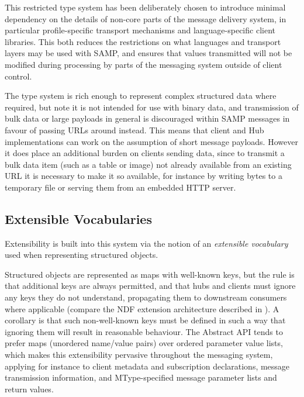 \documentclass[5p]{elsarticle}
\begin{document}
This restricted type system has been deliberately chosen to introduce
minimal dependency on the details of
non-core parts of the message delivery system,
in particular profile-specific transport mechanisms and language-specific
client libraries.
This both reduces the restrictions on what languages and transport layers
may be used with SAMP, and ensures that values transmitted will
not be modified during processing by parts of the messaging system
outside of client control.


The type system is rich enough to represent complex structured data
where required, but note it is not intended for use with
binary data, and transmission of bulk data or large payloads
in general is discouraged within SAMP messages in favour of
passing URLs around instead.
This means that client and Hub implementations can work on the assumption
of short message payloads.
However it does place an additional burden on clients sending data,
since to transmit a bulk data item (such as a table or image)
not already available from an existing URL
it is necessary to make it so available, for instance by writing
bytes to a temporary file or serving them from an embedded HTTP server.

\subsection{Extensible Vocabularies} \label{sec:extVocabs}

Extensibility is built into this system via the notion of an
{\em extensible vocabulary} used when representing structured objects.

Structured objects are represented as maps with well-known keys,
but the rule is that additional keys are always permitted,
and that hubs and clients must ignore any keys they do not understand,
propagating them to downstream consumers where applicable
(compare the NDF extension architecture described in \citet{sgp38}).
A corollary is that such non-well-known keys must be defined in such
a way that ignoring them will result in reasonable behaviour.
The Abstract API tends to prefer maps (unordered name/value pairs)
over ordered parameter value lists, which makes this extensibility
pervasive throughout the messaging system,
applying for instance to
client metadata and subscription declarations,
message transmission information,
and MType-specified message parameter lists and return values.
\end{document}
